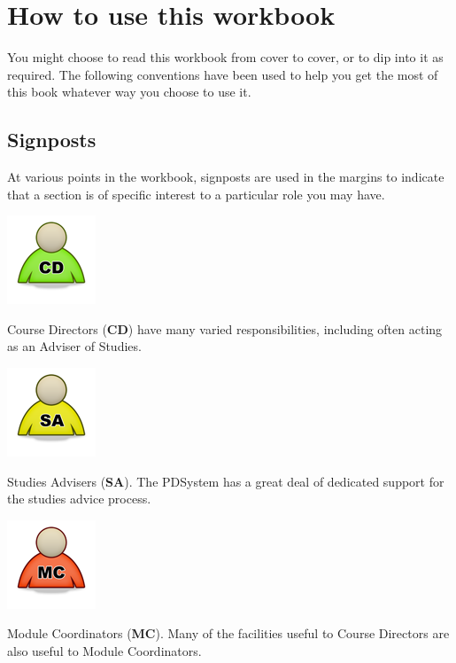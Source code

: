 \documentclass[12 pt]{book}
\begin{document}
\chapter{How to use this workbook}

You 
might choose to read this workbook from cover to cover,
or to dip into it as required. The following conventions
have been 
used to help you get the most of this book whatever way you choose to use it. 

\section{Signposts}

At various points in the workbook, signposts are used in
the margins to indicate that a section is of specific
interest to a particular role you may have.

\parbox{2 cm}{\includegraphics{png/icon_cd.png}}
\parbox{9 cm}{Course Directors ({\bfseries CD}) have many varied responsibilities,
including often acting as an Adviser of Studies.}
\medskip

\parbox{2 cm}{\includegraphics{png/icon_sa.png}}
\parbox{9 cm}{Studies Advisers ({\bfseries SA}). The PDSystem has a great deal of
dedicated support for the studies advice process.}
\medskip

\parbox{2 cm}{\includegraphics{png/icon_mc.png}}
\parbox{9 cm}{Module Coordinators ({\bfseries MC}). Many
of the facilities useful to Course Directors are also
useful to Module Coordinators.}
\medskip
\end{document}
